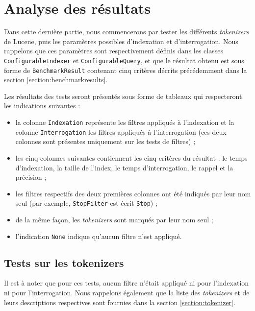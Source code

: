 \section{Analyse des résultats}

Dans cette dernière partie, nous commencerons par tester les différents \textit{tokenizers} de Lucene, puis les paramètres possibles d’indexation et d’interrogation. Nous rappelons que ces paramètres sont respectivement définis dans les classes \texttt{ConfigurableIndexer} et \texttt{ConfigurableQuery}, et que le résultat obtenu est sous forme de \texttt{BenchmarkResult} contenant cinq critères décrits précédemment dans la section \ref{section:benchmarkresults}.

Les résultats des tests seront présentés sous forme de tableaux qui respecteront les indications suivantes :
\begin{itemize}
    \item la colonne \texttt{Indexation} représente les filtres appliqués à l’indexation et la colonne \texttt{Interrogation} les filtres appliqués à l’interrogation (ces deux colonnes sont présentes uniquement sur les tests de filtres) ;
    \item les cinq colonnes suivantes contiennent les cinq critères du résultat : le temps d’indexation, la taille de l’index, le temps d’interrogation, le rappel et la précision ;
    \item les filtres respectifs des deux premières colonnes ont été indiqués par leur nom seul (par exemple, \texttt{StopFilter} est écrit \texttt{Stop}) ;
    \item de la même façon, les \textit{tokenizers} sont marqués par leur nom seul ;
    \item l’indication \texttt{None} indique qu’aucun filtre n’est appliqué.
\end{itemize}

\subsection{Tests sur les tokenizers}

Il est à noter que pour ces tests, aucun filtre n’était appliqué ni pour l’indexation ni pour l’interrogation. Nous rappelons également que la liste des \textit{tokenizers} et de leurs descriptions respectives sont fournies dans la section \ref{section:tokenizer}.

